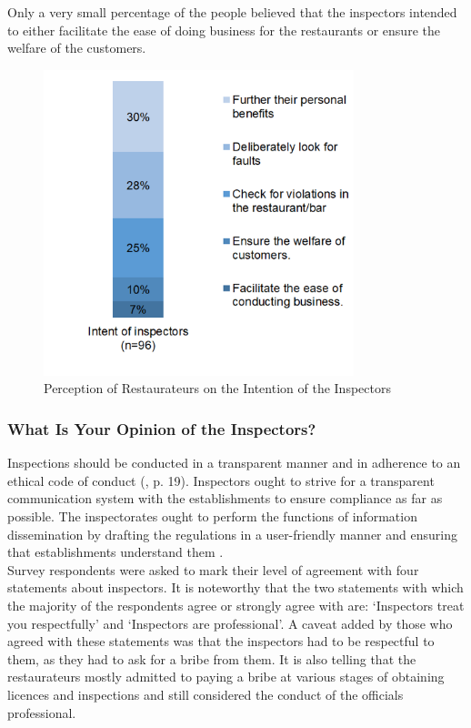 \documentclass[a4paper, 12pt]{article}
\begin{document}
		Only a very small percentage of the people believed that the inspectors intended to either facilitate the ease of doing business for the restaurants or ensure the welfare of the customers.

		\begin{figure}[H]
                    	\centering
                    	\includegraphics[height = 3.5in]{Figure7.png}
                    	\caption[Optional Caption]{Perception of Restaurateurs on the Intention of the Inspectors} %
		\end{figure}

		\subsubsection {What Is Your Opinion of the Inspectors?}
				
		Inspections should be conducted in a transparent manner and in adherence to an ethical code of conduct (\cite{cigie2012}, p. 19). Inspectors ought to strive for a transparent communication system with the establishments to ensure compliance as far as 
possible. The inspectorates ought to perform the functions of information dissemination by drafting the regulations in a user-friendly manner and ensuring that establishments understand them \parencite{jacobs2005good}.\\
		
		Survey respondents were asked to mark their level of agreement with four statements about inspectors. It is noteworthy that the two statements with which the majority of the respondents agree or strongly agree with are: ‘Inspectors treat you respectfully’ 
and ‘Inspectors are professional’. A caveat added by those who agreed with these statements was that the inspectors had to be respectful to them, as they had to ask for a bribe from them. It is also telling that the restaurateurs mostly admitted to paying a bribe at 
various stages of obtaining licences and inspections and still considered the conduct of the officials professional.
		
\end{document}
